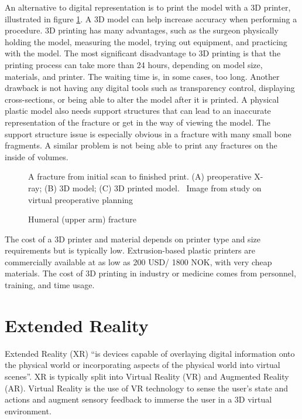 \documentclass[a4paper]{report}
\begin{document}
An alternative to digital representation is to print the model with a 3D printer, illustrated in figure \ref{3dprint}. A 3D model can help increase accuracy when performing a procedure\cite{shahrubudin_overview_2019}. 3D printing has many advantages, such as the surgeon physically holding the model, measuring the model, trying out equipment, and practicing with the model.
The most significant disadvantage to 3D printing is that the printing process can take more than 24 hours, depending on model size, materials, and printer. The waiting time is, in some cases, too long. 
Another drawback is not having any digital tools such as transparency control, displaying cross-sections, or being able to alter the model after it is printed. 
A physical plastic model also needs support structures that can lead to an inaccurate representation of the fracture or get in the way of viewing the model. The support structure issue is especially obvious in a fracture with many small bone fragments. A similar problem is not being able to print any fractures on the inside of volumes.

\begin{figure}[h!]
    \centering
	\hfill
  \caption{Humeral (upper arm) fracture}
  \label{3dprint}
  \small
    A fracture from initial scan to finished print. (A) preoperative X-ray; (B) 3D model; (C) 3D printed model.
~Image from study on virtual preoperative planning~\cite{mishra_virtual_2019}
\end{figure}
The cost of a 3D printer and material depends on printer type and size requirements but is typically low. Extrusion-based plastic printers are commercially available at as low as 200 USD/ 1800 NOK, with very cheap materials. The cost of 3D printing in industry or medicine comes from personnel, training, and time usage\cite{shahrubudin_overview_2019}.


\section{Extended Reality}
Extended Reality (XR) \enquote{is devices capable of overlaying digital information onto the physical world or incorporating aspects of the physical world into virtual scenes}\cite{andrews_extended_2019}.
XR is typically split into Virtual Reality (VR) and Augmented Reality (AR).
Virtual Reality is the use of VR technology to sense the user's state and actions and augment sensory feedback to immerse the user in a 3D virtual environment\cite{mihelj_virtual_2014}.
\end{document}
